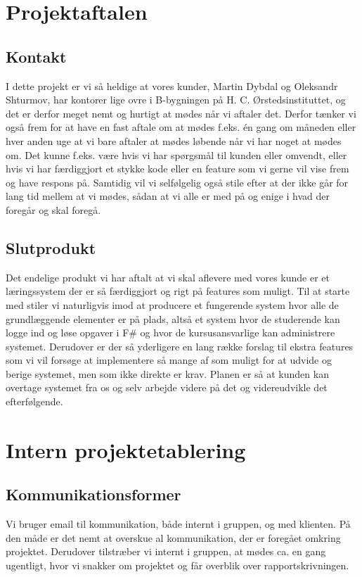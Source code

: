 \documentclass[12pt]{article}
\begin{document}
\section{Projektaftalen}
\subsection{Kontakt}
I dette projekt er vi så heldige at vores kunder, Martin Dybdal og Oleksandr Shturmov, har kontorer lige ovre i B-bygningen på H. C. Ørstedsinstituttet, og det er derfor meget nemt og hurtigt at mødes når vi aftaler det. Derfor tænker vi også frem for at have en fast aftale om at mødes f.eks. én gang om måneden eller hver anden uge at vi bare aftaler at mødes løbende når vi har noget at mødes om. Det kunne f.eks. være hvis vi har spørgsmål til kunden eller omvendt, eller hvis vi har færdiggjort et stykke kode eller en feature som vi gerne vil vise frem og have respons på. Samtidig vil vi selfølgelig også stile efter at der ikke går for lang tid mellem at vi mødes, sådan at vi alle er med på og enige i hvad der foregår og skal foregå.

\subsection{Slutprodukt}
Det endelige produkt vi har aftalt at vi skal aflevere med vores kunde er et læringssystem der er så færdiggjort og rigt på features som muligt. Til at starte med stiler vi naturligvis imod at producere et fungerende system hvor alle de grundlæggende elementer er på plads, altså et system hvor de studerende kan logge ind og løse opgaver i F\# og hvor de kursusansvarlige kan administrere systemet. Derudover er der så yderligere en lang række forslag til ekstra features som vi vil forsøge at implementere så mange af som muligt for at udvide og berige systemet, men som ikke direkte er krav. Planen er så at kunden kan overtage systemet fra os og selv arbejde videre på det og videreudvikle det efterfølgende.


\section{Intern projektetablering}
\subsection{Kommunikationsformer}
Vi bruger email til kommunikation, både internt i gruppen, og med klienten. På den måde er det nemt at overskue al kommunikation, der er foregået omkring projektet.
Derudover tilstræber vi internt i gruppen, at mødes ca. en gang ugentligt, hvor vi snakker om projektet og får overblik over rapportskrivningen.
\end{document}
